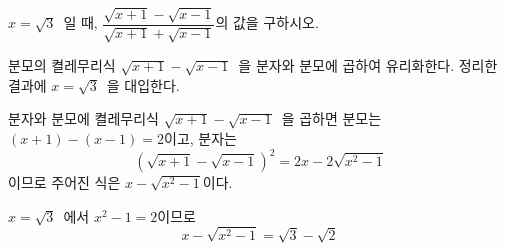 \documentclass[10pt]{article}
\begin{document}
\newpage


\begin{dmproblem}
$x = \sqrt{3}$\ 일 때, $\dfrac{\sqrt{x + 1} - \sqrt{x - 1}}{\sqrt{x + 1} + \sqrt{x - 1}}$의 값을 구하시오.
\end{dmproblem}

\begin{dmapproach}
분모의 켤레무리식 $\sqrt{x + 1} - \sqrt{x - 1}$\ 을 분자와 분모에 곱하여 유리화한다. 정리한 결과에 $x = \sqrt{3}$\ 을 대입한다.
\end{dmapproach}

\begin{dmsolution}
분자와 분모에 켤레무리식 $\sqrt{x + 1} - \sqrt{x - 1}$\ 을 곱하면 분모는 $(x + 1) - (x - 1) = 2$이고, 분자는
\begin{equation*}
  (\sqrt{x + 1} - \sqrt{x - 1})^{2} = 2x - 2\sqrt{x^{2} - 1}
\end{equation*}
이므로 주어진 식은 $x - \sqrt{x^{2} - 1}$이다.

$x = \sqrt{3}$\ 에서 $x^{2} - 1 = 2$이므로
\begin{equation*}
  x - \sqrt{x^{2} - 1} = \sqrt{3} - \sqrt{2}
\end{equation*}
\end{dmsolution}

\dmchecktitle



\newpage

\end{document}
